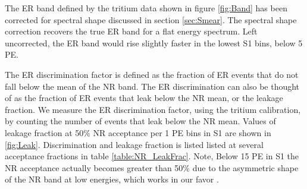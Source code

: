 The ER band defined by the tritium data shown in figure \ref{fig:Band} has been corrected for spectral shape discussed in section \ref{sec:Smear}. The spectral shape correction recovers the true ER band for a flat energy spectrum. Left uncorrected, the ER band would rise slightly faster in the lowest S1 bins, below 5 PE. 

The ER discrimination factor is defined as the fraction of ER events that do not fall below the mean of the NR band. The ER discrimination can also be thought of as the fraction of ER events that leak below the NR mean, or the leakage fraction. We measure the ER discrimination factor, using the tritium calibration, by counting the number of events that leak below the NR mean. Values of leakage fraction at 50\% NR acceptance per 1 PE bins in S1 are shown in \ref{fig:Leak}. Discrimination and leakage fraction is listed listed at several acceptance fractions in table \ref{table:NR_LeakFrac}. Note, Below 15 PE in S1 the NR acceptance actually becomes greater than 50\% due to the asymmetric shape of the NR band at low energies, which works in our favor \cite{NEST} \cite{NEST_2013}.

